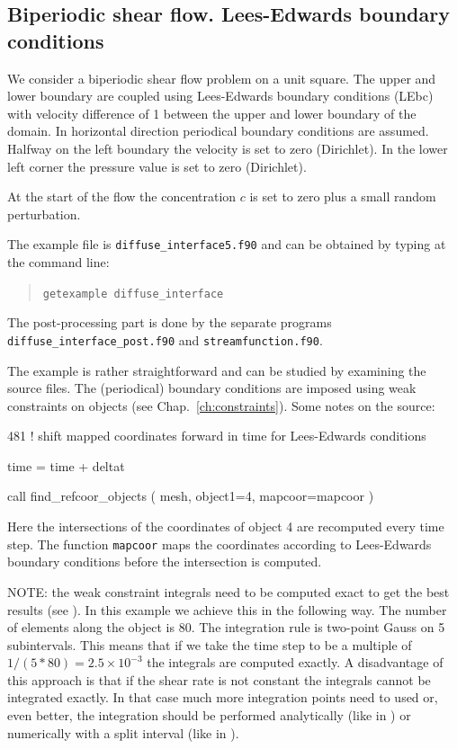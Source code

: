 \subsection{Biperiodic shear flow. Lees-Edwards boundary conditions}
\label{sec:couettedi5}

We consider a biperiodic shear flow problem on a unit square.
The upper and lower boundary are coupled using Lees-Edwards boundary
conditions (LEbc) with velocity difference of 1 between the upper and lower
boundary of the domain.
In horizontal direction periodical boundary conditions are assumed.
Halfway on the left boundary the velocity is set to zero (Dirichlet).
In the lower left corner the pressure value is set to zero (Dirichlet).

At the start of the flow the concentration $c$ is set to zero
plus a small random perturbation.

The example file is \texttt{diffuse\_interface5.f90}
and can be obtained by typing at the
command line:
\medskip
\begin{quote}
   \texttt{getexample diffuse\_interface}
\end{quote}
The post-processing part is done by the separate programs
\texttt{diffuse\_interface\_post.f90} and \texttt{streamfunction.f90}.

The example is rather straightforward and can be studied by examining the
source files. The (periodical) boundary conditions are imposed using
weak constraints on objects (see Chap.~\ref{ch:constraints}).
Some notes on the source:
\begin{listing}{481}
!   shift mapped coordinates forward in time for Lees-Edwards conditions

    time = time + deltat

    call find_refcoor_objects ( mesh, object1=4, mapcoor=mapcoor )
\end{listing}
Here the intersections of the coordinates of object 4 are recomputed every time
step. The function \texttt{mapcoor} maps the coordinates according to
Lees-Edwards boundary conditions before the intersection is computed.

NOTE: the weak constraint integrals need to be computed
exact to get the best results (see \cite{Hwang04}).
In this example we achieve this in the following way. 
The number of elements along the object is 80. The integration rule is
two-point Gauss on 5 subintervals. This means that if we take the time step to
be a multiple of $1/(5*80)=2.5\times10^{-3}$ the integrals are computed 
exactly.
A disadvantage of this approach is that if the shear rate is not constant the
integrals cannot be integrated exactly. In that case much more integration
points need to used or, even better, the integration should be performed
analytically (like in \cite{Hwang04}) or numerically with a split interval
(like in \cite{Anderson06}).


